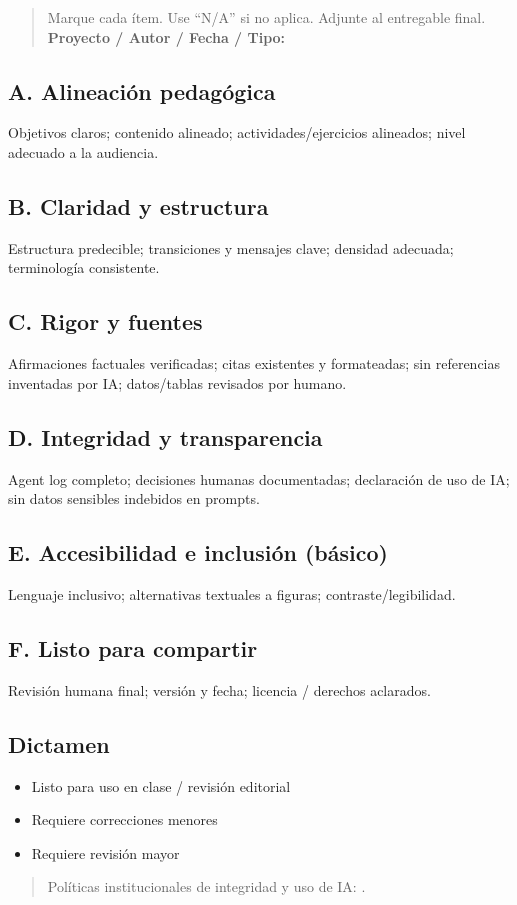 
\begin{quote}
Marque cada ítem. Use ``N/A'' si no aplica. Adjunte al entregable final.\\
\textbf{Proyecto / Autor / Fecha / Tipo:} \underline{\hspace{10cm}}
\end{quote}

\subsection*{A. Alineación pedagógica}
Objetivos claros; contenido alineado; actividades/ejercicios alineados; nivel adecuado a la audiencia.

\subsection*{B. Claridad y estructura}
Estructura predecible; transiciones y mensajes clave; densidad adecuada; terminología consistente.

\subsection*{C. Rigor y fuentes}
Afirmaciones factuales verificadas; citas existentes y formateadas; sin referencias inventadas por IA; datos/tablas revisados por humano.

\subsection*{D. Integridad y transparencia}
Agent log completo; decisiones humanas documentadas; declaración de uso de IA; sin datos sensibles indebidos en prompts.

\subsection*{E. Accesibilidad e inclusión (básico)}
Lenguaje inclusivo; alternativas textuales a figuras; contraste/legibilidad.

\subsection*{F. Listo para compartir}
Revisión humana final; versión y fecha; licencia / derechos aclarados.

\subsection*{Dictamen}
\begin{itemize}
\item[$\square$] Listo para uso en clase / revisión editorial
\item[$\square$] Requiere correcciones menores
\item[$\square$] Requiere revisión mayor
\end{itemize}

\begin{quote}
Políticas institucionales de integridad y uso de IA: \ceddie.
\end{quote}
